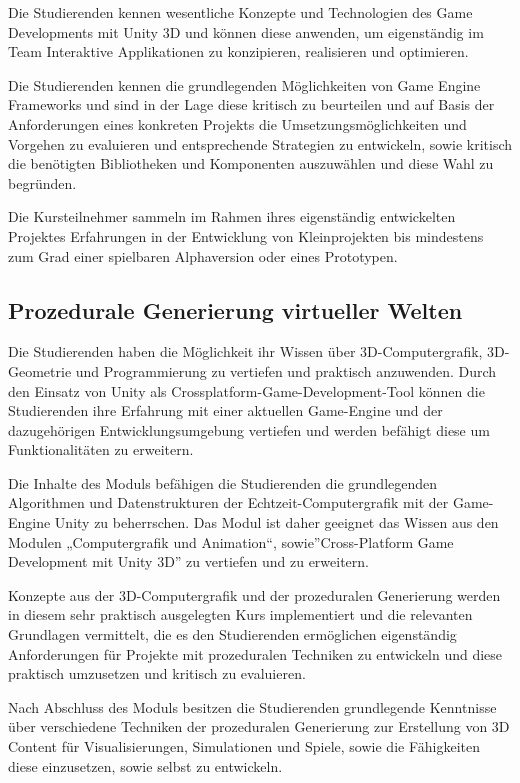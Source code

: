 Die Studierenden kennen wesentliche Konzepte und Technologien des Game
Developments mit Unity 3D und können diese anwenden, um eigenständig im
Team Interaktive Applikationen zu konzipieren, realisieren und
optimieren.

Die Studierenden kennen die grundlegenden Möglichkeiten von Game Engine
Frameworks und sind in der Lage diese kritisch zu beurteilen und auf
Basis der Anforderungen eines konkreten Projekts die
Umsetzungsmöglichkeiten und Vorgehen zu evaluieren und entsprechende
Strategien zu entwickeln, sowie kritisch die benötigten Bibliotheken und
Komponenten auszuwählen und diese Wahl zu begründen.

Die Kursteilnehmer sammeln im Rahmen ihres eigenständig entwickelten
Projektes Erfahrungen in der Entwicklung von Kleinprojekten bis
mindestens zum Grad einer spielbaren Alphaversion oder eines Prototypen.

\subsection{Prozedurale Generierung virtueller
Welten}\label{prozedurale-generierung-virtueller-welten}

Die Studierenden haben die Möglichkeit ihr Wissen über
3D-Computergrafik, 3D-Geometrie und Programmierung zu vertiefen und
praktisch anzuwenden. Durch den Einsatz von Unity als
Crossplatform-Game-Development-Tool können die Studierenden ihre
Erfahrung mit einer aktuellen Game-Engine und der dazugehörigen
Entwicklungsumgebung vertiefen und werden befähigt diese um
Funktionalitäten zu erweitern.

Die Inhalte des Moduls befähigen die Studierenden die grundlegenden
Algorithmen und Datenstrukturen der Echtzeit-Computergrafik mit der
Game-Engine Unity zu beherrschen. Das Modul ist daher geeignet das
Wissen aus den Modulen „Computergrafik und Animation``,
sowie''Cross-Platform Game Development mit Unity 3D'' zu vertiefen und
zu erweitern.

Konzepte aus der 3D-Computergrafik und der prozeduralen Generierung
werden in diesem sehr praktisch ausgelegten Kurs implementiert und die
relevanten Grundlagen vermittelt, die es den Studierenden ermöglichen
eigenständig Anforderungen für Projekte mit prozeduralen Techniken zu
entwickeln und diese praktisch umzusetzen und kritisch zu evaluieren.

Nach Abschluss des Moduls besitzen die Studierenden grundlegende
Kenntnisse über verschiedene Techniken der prozeduralen Generierung zur
Erstellung von 3D Content für Visualisierungen, Simulationen und Spiele,
sowie die Fähigkeiten diese einzusetzen, sowie selbst zu entwickeln.

